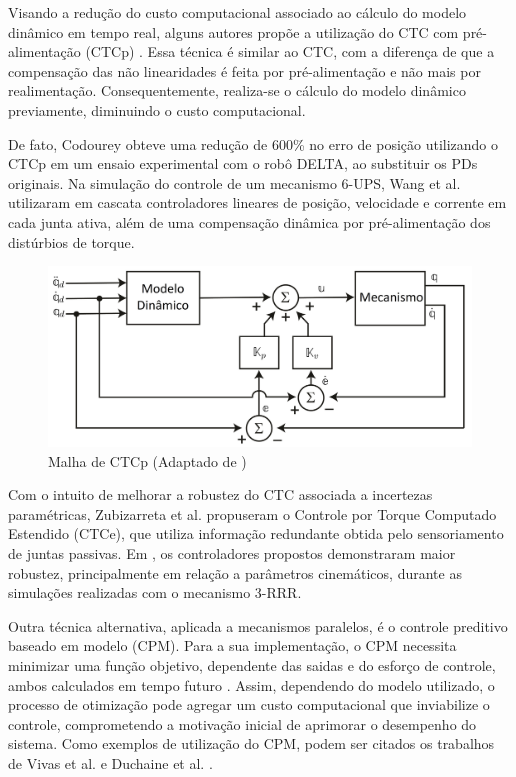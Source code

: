 \documentclass[]{politex}
\begin{document}
Visando a redução do custo computacional associado ao cálculo do modelo dinâmico em tempo real, alguns autores propõe a utilização do CTC com pré-alimentação (CTCp) \cite{Khalil, Siciliano, Spong}. Essa técnica é similar ao CTC, com a diferença de que a compensação das não linearidades é feita por pré-alimentação e não mais por realimentação.  Consequentemente, realiza-se o cálculo do modelo dinâmico previamente, diminuindo o custo computacional.

De fato, Codourey \cite{Codourey} obteve uma redução de 600\% no erro de posição utilizando o CTCp em um ensaio experimental com o robô DELTA, ao substituir os PDs originais. Na simulação do controle de um mecanismo 6-UPS, Wang et al. \cite{Wang} utilizaram em cascata controladores lineares de posição, velocidade e corrente em cada junta ativa, além de  uma compensação dinâmica por pré-alimentação dos distúrbios de torque.

\begin{figure}[h]
	\centering
	\includegraphics[scale=0.385]{../figures/CTCp.jpg}  
	\caption{Malha de CTCp (Adaptado de \cite{Craig})}
	\label{fig:CTCp}
\end{figure}

Com o intuito de melhorar a robustez do CTC associada a incertezas paramétricas, Zubizarreta et al. \cite{Zubizarreta, Zubizarreta2, Zubizarreta3, Zubizarreta4} propuseram  o  Controle por Torque Computado Estendido (CTCe), que utiliza informação redundante obtida pelo sensoriamento de juntas passivas. Em \cite{Zubizarreta}, os controladores propostos demonstraram maior robustez, principalmente em relação a parâmetros cinemáticos, durante as simulações realizadas com o mecanismo 3-RRR.

Outra técnica alternativa, aplicada a mecanismos paralelos, é o controle preditivo baseado em modelo (CPM). Para a sua implementação, o CPM necessita minimizar uma função objetivo, dependente das saidas e do esforço de controle, ambos calculados em tempo futuro \cite{Camacho}. Assim, dependendo do modelo utilizado, o processo de otimização pode agregar um custo computacional que inviabilize o controle, comprometendo a motivação inicial de aprimorar o desempenho do sistema. Como exemplos de utilização do CPM, podem ser citados os trabalhos de Vivas et al. \cite{Vivas} e   Duchaine et al. \cite{Duchaine}.
\end{document}
